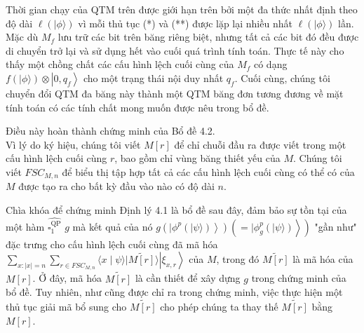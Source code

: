 \documentclass[10pt]{article}
\begin{document}
Thời gian chạy của QTM trên được giới hạn trên bởi một đa thức nhất định theo độ dài $\ell(|\phi\rangle)$ vì mỗi thủ tục (*) và (**) được lặp lại nhiều nhất $\ell(|\phi\rangle)$ lần. Mặc dù $M_{f}$ lưu trữ các bit trên băng riêng biệt, nhưng tất cả các bit đó đều được di chuyển trở lại và sử dụng hết vào cuối quá trình tính toán. Thực tế này cho thấy một chồng chất các cấu hình lệch cuối cùng của $M_{f}$ có dạng $f(|\phi\rangle) \otimes\left|0, q_{f}\right\rangle$ cho một trạng thái nội duy nhất $q_{f}$. Cuối cùng, chúng tôi chuyển đổi QTM đa băng này thành một QTM băng đơn tương đương về mặt tính toán có các tính chất mong muốn được nêu trong bổ đề.

Điều này hoàn thành chứng minh của Bổ đề 4.2.\\
Vì lý do ký hiệu, chúng tôi viết $M[r]$ để chỉ chuỗi đầu ra được viết trong một cấu hình lệch cuối cùng $r$, bao gồm chỉ vùng băng thiết yếu của $M$. Chúng tôi viết $F S C_{M, n}$ để biểu thị tập hợp tất cả các cấu hình lệch cuối cùng có thể có của $M$ được tạo ra cho bất kỳ đầu vào nào có độ dài $n$.

Chìa khóa để chứng minh Định lý 4.1 là bổ đề sau đây, đảm bảo sự tồn tại của một hàm $\widehat{\square_{1}^{\mathrm{QP}}}$ $g$ mà kết quả của nó $\left.\left.g\left(\mid \phi^{p}(|\psi\rangle)\right\rangle\right)\left(=\mid \phi_{g}^{p}(|\psi\rangle)\right\rangle\right)$ "gần như" đặc trưng cho cấu hình lệch cuối cùng đã mã hóa $\sum_{x:|x|=n} \sum_{r \in F S C_{M, n}}\langle x \mid \psi\rangle|\widetilde{M[r]}\rangle\left|\xi_{x, r}\right\rangle$ của $M$, trong đó $\widetilde{M[r]}$ là mã hóa của $M[r]$. Ở đây, mã hóa $\widetilde{M[r]}$ là cần thiết để xây dựng $g$ trong chứng minh của bổ đề. Tuy nhiên, như cũng được chỉ ra trong chứng minh, việc thực hiện một thủ tục giải mã bổ sung cho $\widetilde{M[r]}$ cho phép chúng ta thay thế $\widetilde{M[r]}$ bằng $M[r]$.
\end{document}
